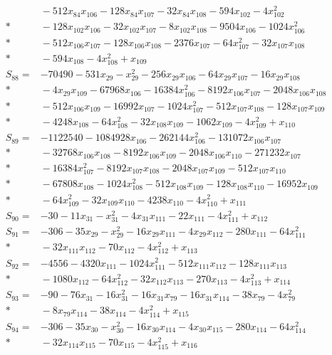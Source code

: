 \begin{align*}
&{}-512x_{84}x_{106}-128x_{84}x_{107}-32x_{84}x_{108}-594x_{102}-4x_{102}^{2}\\*
&{}-128x_{102}x_{106}-32x_{102}x_{107}-8x_{102}x_{108}-9504x_{106}-1024x_{106}^{2}\\*
&{}-512x_{106}x_{107}-128x_{106}x_{108}-2376x_{107}-64x_{107}^{2}-32x_{107}x_{108}\\*
&{}-594x_{108}-4x_{108}^{2}+x_{109}\\[3pt]
S_{88}={}&-70490-531x_{29}-x_{29}^{2}-256x_{29}x_{106}-64x_{29}x_{107}-16x_{29}x_{108}\\*
&{}-4x_{29}x_{109}-67968x_{106}-16384x_{106}^{2}-8192x_{106}x_{107}-2048x_{106}x_{108}\\*
&{}-512x_{106}x_{109}-16992x_{107}-1024x_{107}^{2}-512x_{107}x_{108}-128x_{107}x_{109}\\*
&{}-4248x_{108}-64x_{108}^{2}-32x_{108}x_{109}-1062x_{109}-4x_{109}^{2}+x_{110}\\[3pt]
S_{89}={}&-1122540-1084928x_{106}-262144x_{106}^{2}-131072x_{106}x_{107}\\*
&{}-32768x_{106}x_{108}-8192x_{106}x_{109}-2048x_{106}x_{110}-271232x_{107}\\*
&{}-16384x_{107}^{2}-8192x_{107}x_{108}-2048x_{107}x_{109}-512x_{107}x_{110}\\*
&{}-67808x_{108}-1024x_{108}^{2}-512x_{108}x_{109}-128x_{108}x_{110}-16952x_{109}\\*
&{}-64x_{109}^{2}-32x_{109}x_{110}-4238x_{110}-4x_{110}^{2}+x_{111}\\[3pt]
S_{90}={}&-30-11x_{31}-x_{31}^{2}-4x_{31}x_{111}-22x_{111}-4x_{111}^{2}+x_{112}\\[3pt]
S_{91}={}&-306-35x_{29}-x_{29}^{2}-16x_{29}x_{111}-4x_{29}x_{112}-280x_{111}-64x_{111}^{2}\\*
&{}-32x_{111}x_{112}-70x_{112}-4x_{112}^{2}+x_{113}\\[3pt]
S_{92}={}&-4556-4320x_{111}-1024x_{111}^{2}-512x_{111}x_{112}-128x_{111}x_{113}\\*
&{}-1080x_{112}-64x_{112}^{2}-32x_{112}x_{113}-270x_{113}-4x_{113}^{2}+x_{114}\\[3pt]
S_{93}={}&-90-76x_{31}-16x_{31}^{2}-16x_{31}x_{79}-16x_{31}x_{114}-38x_{79}-4x_{79}^{2}\\*
&{}-8x_{79}x_{114}-38x_{114}-4x_{114}^{2}+x_{115}\\[3pt]
S_{94}={}&-306-35x_{30}-x_{30}^{2}-16x_{30}x_{114}-4x_{30}x_{115}-280x_{114}-64x_{114}^{2}\\*
&{}-32x_{114}x_{115}-70x_{115}-4x_{115}^{2}+x_{116}\\[3pt]

\end{align*}
